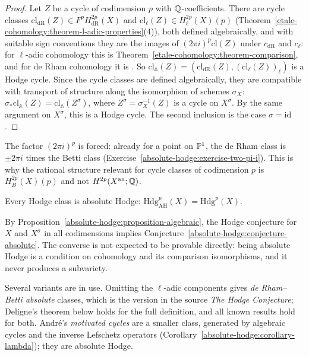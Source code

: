 \begin{proof}
Let $Z$ be a cycle of codimension $p$ with $\mathbb{Q}$-coefficients. There are cycle classes $\mathrm{cl}_{\mathrm{dR}}(Z) \in F^pH^{2p}_{\mathrm{dR}}(X)$ and $\mathrm{cl}_\ell(Z) \in H^{2p}_\ell(X)(p)$
(Theorem~\ref{etale-cohomology:theorem-l-adic-properties}(4)), both defined algebraically, and with suitable sign conventions they are the images of $(2\pi i)^p\mathrm{cl}(Z)$ under $c_{\mathrm{dR}}$ and $c_\ell$:
for $\ell$-adic cohomology this is Theorem~\ref{etale-cohomology:theorem-comparison}, and for de Rham cohomology it is \cite{deligne-abelian}. So $\mathrm{cl}_{\mathbb{A}}(Z) = (\mathrm{cl}_{\mathrm{dR}}(Z), (\mathrm{cl}_\ell(Z))_\ell)$ is a Hodge cycle. Since the cycle classes are defined algebraically,
they are compatible with transport of structure along the isomorphism of schemes $\sigma_X$: $\sigma_*\mathrm{cl}_{\mathbb{A}}(Z) = \mathrm{cl}_{\mathbb{A}}(Z^\sigma)$, where $Z^\sigma = \sigma_X^{-1}(Z)$ is a cycle on
$X^\sigma$. By the same argument on $X^\sigma$, this is a Hodge cycle. The second inclusion is the case $\sigma = \mathrm{id}$.
\end{proof}

\begin{remark}\label{absolute-hodge:remark-two-pi-i}
The factor $(2\pi i)^p$ is forced: already for a point on $\mathbb{P}^1$, the de Rham class is $\pm 2\pi i$ times the Betti class (Exercise~\ref{absolute-hodge:exercise-two-pi-i}). This is why the rational
structure relevant for cycle classes of codimension $p$ is $H^{2p}_B(X)(p)$ and not $H^{2p}(X^{\mathrm{an}}; \mathbb{Q})$.
\end{remark}

\begin{conjecture}\label{absolute-hodge:conjecture-absolute}
Every Hodge class is absolute Hodge: $\mathrm{Hdg}^p_{\mathrm{AH}}(X) = \mathrm{Hdg}^p(X)$.
\end{conjecture}

By Proposition~\ref{absolute-hodge:proposition-algebraic}, the Hodge conjecture for $X$ and $X^\sigma$ in all codimensions implies Conjecture~\ref{absolute-hodge:conjecture-absolute}. The
converse is not expected to be provable directly: being absolute Hodge is a condition on cohomology and its comparison isomorphisms, and it never produces a subvariety.

\begin{remark}\label{absolute-hodge:remark-de-rham-betti}
Several variants are in use. Omitting the $\ell$-adic components gives \emph{de Rham--Betti absolute} classes, which is the version in the source \emph{The Hodge Conjecture}; Deligne's theorem below holds
for the full definition, and all known results hold for both. Andr\'e's \emph{motivated cycles} \cite{andre-1996-motifs} are a smaller class, generated by algebraic cycles and the inverse Lefschetz
operators (Corollary~\ref{absolute-hodge:corollary-lambda}); they are absolute Hodge.
\end{remark}

